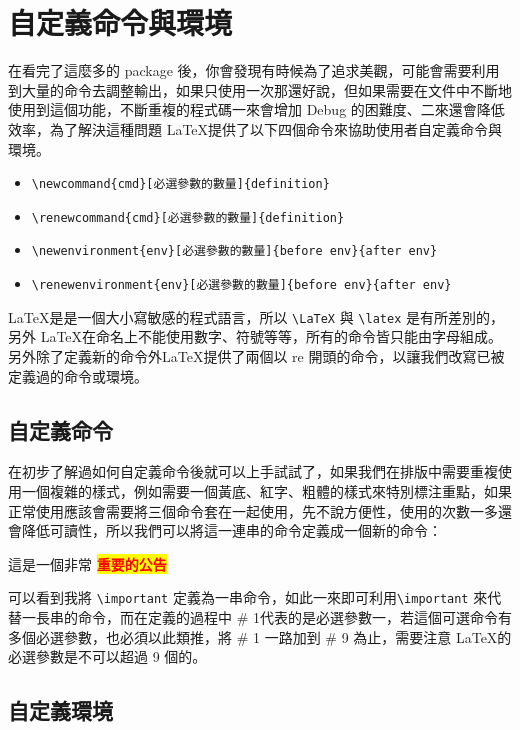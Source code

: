 \chapter{自定義命令與環境}

在看完了這麼多的 package 後，你會發現有時候為了追求美觀，可能會需要利用到大量的命令去調整輸出，如果只使用一次那還好說，但如果需要在文件中不斷地使用到這個功能，不斷重複的程式碼一來會增加 Debug 的困難度、二來還會降低效率，為了解決這種問題 \LaTeX 提供了以下四個命令來協助使用者自定義命令與環境。

\begin{itemize}
\item \verb|\newcommand{cmd}[必選參數的數量]{definition}|
\item \verb|\renewcommand{cmd}[必選參數的數量]{definition}|
\item \verb|\newenvironment{env}[必選參數的數量]{before env}{after env}|
\item \verb|\renewenvironment{env}[必選參數的數量]{before env}{after env}|
\end{itemize}

\LaTeX 是是一個大小寫敏感的程式語言，所以 \verb|\LaTeX| 與 \verb|\latex| 是有所差別的，另外 \LaTeX 在命名上不能使用數字、符號等等，所有的命令皆只能由字母組成。另外除了定義新的命令外\LaTeX 提供了兩個以 re 開頭的命令，以讓我們改寫已被定義過的命令或環境。

\section{自定義命令}

在初步了解過如何自定義命令後就可以上手試試了，如果我們在排版中需要重複使用一個複雜的樣式，例如需要一個黃底、紅字、粗體的樣式來特別標注重點，如果正常使用應該會需要將三個命令套在一起使用，先不說方便性，使用的次數一多還會降低可讀性，所以我們可以將這一連串的命令定義成一個新的命令：

\begin{tcblisting}{}
\newcommand{\important}[1]{%
\colorbox{yellow}{\textcolor{red}{\textbf{#1}}}
}
這是一個非常\important{重要的公告}
\end{tcblisting}

可以看到我將 \verb|\important| 定義為一串命令，如此一來即可利用\verb|\important| 來代替一長串的命令，而在定義的過程中 \# 1代表的是必選參數一，若這個可選命令有多個必選參數，也必須以此類推，將 \# 1 一路加到 \# 9 為止，需要注意 \LaTeX 的必選參數是不可以超過 9 個的。

\section{自定義環境}

